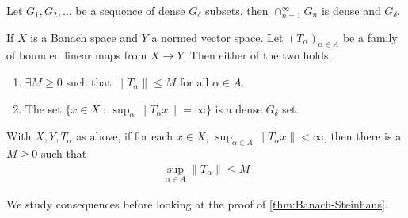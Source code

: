 

\begin{corollary}
  Let $G_1 , G_2 , \ldots$ be a sequence of dense $G_\delta$ subsets,
  then $\cap_{n = 1}^{\infty}G_n$ is dense and $G_\delta$.
\end{corollary}

\begin{theorem}
  \label{thm:Banach-Steinhaus}
  If $X$ is a Banach space and $Y$ a normed vector space. Let
  $(T_\alpha)_{\alpha \in A}$ be a family of bounded linear maps from
  $X \to Y$. Then either of the two holds,
  \begin{enumerate}[label=(\arabic*)]
    \item $\exists M \ge 0$ such that $\|T_\alpha\| \le M$ for all $
      \alpha \in A$.
    \item The set $\{ x \in X  \ : \  \sup_{\alpha}\|T_\alpha x\| =
      \infty \}$ is a dense $G_\delta$ set.
  \end{enumerate}
\end{theorem}

\begin{corollary}
  With $X, Y, T_\alpha$ as above, if for each $x \in X$,
  $\sup_{\alpha \in A} \|T_\alpha x\| < \infty$, then there is a $M
  \ge 0$ such that
  \begin{align*}
    \sup_{\alpha \in A} \|T_\alpha\| \le M
  \end{align*}
\end{corollary}

We study consequences before looking at the proof of
\autoref{thm:Banach-Steinhaus}.

